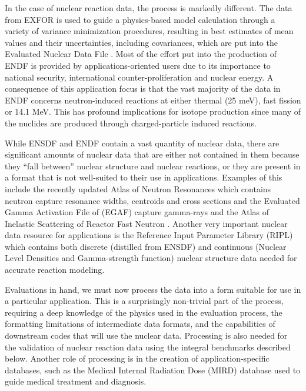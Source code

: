 \documentclass[letterpaper]{ar-1col}
\begin{document}
In the case of nuclear reaction data, the process is markedly different.  The data from EXFOR is used to guide a physics-based model calculation through a variety of variance minimization procedures, resulting in best estimates of mean values and their uncertainties, including covariances, which are put into the Evaluated Nuclear Data File \cite{Chadwick2011}.  Most of the effort put into the production of ENDF is provided by applications-oriented users due to its importance to national security, international counter-proliferation and nuclear energy.  A consequence of this application focus is that the vast majority of the data in ENDF concerns neutron-induced reactions at either thermal (25 meV), fast fission or 14.1 MeV.  This has profound implications for isotope production since many of the nuclides are produced through charged-particle induced reactions.  

While ENSDF and ENDF contain a vast quantity of nuclear data, there are significant amounts of nuclear data that are either not contained in them because they “fall between” nuclear structure and nuclear reactions, or they are present in a format that is not well-suited to their use in applications.  Examples of this include the recently updated Atlas of Neutron Resonances \cite{Mug18} which contains neutron capture resonance widths, centroids and cross sections and the Evaluated Gamma Activation File of (EGAF) capture gamma-rays \cite{Fir15} and the Atlas of Inelastic Scattering of Reactor Fast Neutron \cite{Hur18}.  Another very important nuclear data resource for applications is the Reference Input Parameter Library (RIPL) \cite{Capote2009} which contains both discrete (distilled from ENSDF) and continuous (Nuclear Level Densities and Gamma-strength function) nuclear structure data needed for accurate reaction modeling.  
	
Evaluations in hand, we must now process the data into a form suitable for use in a particular application.  This is a surprisingly non-trivial part of the process, requiring a deep knowledge of the physics used in the evaluation process, the formatting limitations of intermediate data formats, and the capabilities of downstream codes that will use the nuclear data.  Processing is also needed for the validation of nuclear reaction data using the integral benchmarks described below.  Another role of processing is in the creation of application-specific databases, such as the Medical Internal Radiation Dose (MIRD) \cite{MIRD} database used to guide medical treatment and diagnosis.  
\end{document}
